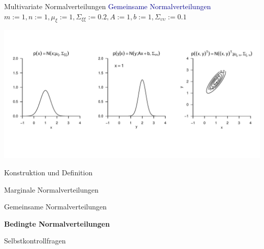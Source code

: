 \documentclass[
  8pt,
  ignorenonframetext,
]{beamer}
\newcommand{\ups}{\upsilon}
\begin{document}
\begin{frame}{Multivariate Normalverteilungen}
\protect\hypertarget{multivariate-normalverteilungen}{}
\textcolor{darkblue}{Gemeinsame Normalverteilungen} \small \vspace{2mm}
\center
\(m := 1, n := 1, \mu_\xi := 1, \Sigma_{\xi\xi} := 0.2, A := 1, b := 1, \Sigma_{\ups\ups} := 0.1\)
\vspace{-2mm}

\begin{center}\includegraphics[width=1.05\linewidth]{6_Abbildungen/mvda_6_gemeinsame_mvnorm} \end{center}
\end{frame}

\begin{frame}{}
\protect\hypertarget{section-6}{}
\large
{}
\vfill

Konstruktion und Definition

Marginale Normalverteilungen

Gemeinsame Normalverteilungen

\textbf{Bedingte Normalverteilungen}

Selbstkontrollfragen \vfill
\end{frame}
\end{document}
